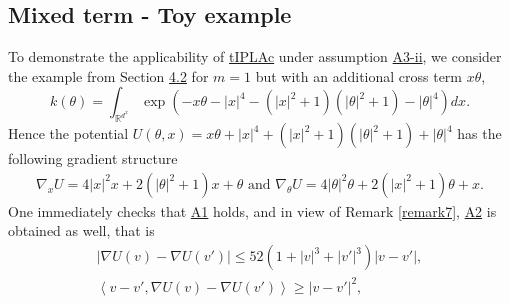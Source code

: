 \documentclass[a4paper, 10pt]{article}
\theoremstyle{plain}%
\begin{document}
\subsection{Mixed term - Toy example}
To demonstrate the applicability of \hyperref[algo2]{tIPLAc} under assumption \hyperlink{Assum3b}{A3-ii}, we consider the example from Section \hyperref[toy]{4.2} for $m=1$ but with an additional cross term $x\theta$,
$$k(\theta)=\int_{\mathbb{R}^{d^x}}\exp{\left(-x\theta-|x|^4-(|x|^2+1)(|\theta|^2+1)-|\theta|^4\right)}dx.$$
Hence the potential $U(\theta,x)=x\theta+|x|^4+(|x|^2+1)(|\theta|^2+1)+|\theta|^4$ has the following gradient structure
\begin{align*}
    \nabla_x U=4|x|^2x+2(|\theta|^2+1)x+\theta \text{ and } \nabla_{\theta} U=4|\theta|^2\theta+2(|x|^2+1)\theta +x.
\end{align*}
One immediately checks that \hyperlink{Assum1}{A1} holds, and in view of Remark \ref{remark7}, \hyperlink{Assum2}{A2} is obtained as well, that is
\begin{gather*}
    |\nabla U(v)-\nabla U(v')|\leq52\left(1+|v|^{3}+|v'|^{3}\right)|v-v'|,\\
    \left\langle v-v',\nabla U(v)-\nabla U(v')\right\rangle\geq |v-v'|^2,
\end{gather*}
\end{document}

